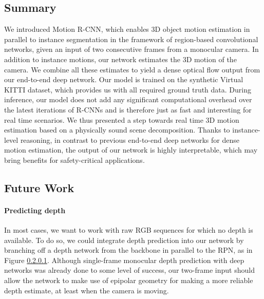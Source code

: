 \subsection{Summary}

We introduced Motion R-CNN, which enables 3D object motion estimation in parallel
to instance segmentation in the framework of region-based convolutional networks,
given an input of two consecutive frames from a monocular camera.
In addition to instance motions, our network estimates the 3D motion of the camera.
We combine all these estimates to yield a dense optical flow output from our
end-to-end deep network.
Our model is trained on the synthetic Virtual KITTI dataset, which provides
us with all required ground truth data.
During inference, our model does not add any significant computational overhead
over the latest iterations of R-CNNs and is therefore just as fast and interesting
for real time scenarios.
We thus presented a step towards real time 3D motion estimation based on a
physically sound scene decomposition. Thanks to instance-level reasoning, in contrast
to previous end-to-end deep networks for dense motion estimation, the output
of our network is highly interpretable, which may bring benefits for safety-critical
applications.

\subsection{Future Work}
\paragraph{Predicting depth}
In most cases, we want to work with raw RGB sequences for which no depth is available.
To do so, we could integrate depth prediction into our network by branching off a
depth network from the backbone in parallel to the RPN, as in Figure \ref{}.
Although single-frame monocular depth prediction with deep networks was already done
to some level of success,
our two-frame input should allow the network to make use of epipolar
geometry for making a more reliable depth estimate, at least when the camera
is moving.

